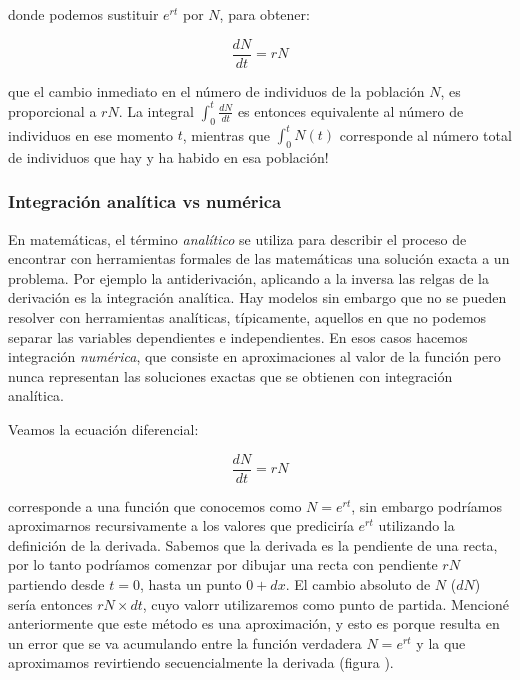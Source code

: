 \documentclass[
]{book}
\begin{document}
donde podemos sustituir \(e^{rt}\) por \(N\), para obtener:

\begin{equation}
\frac{dN}{dt} = r N
\end{equation}

que el cambio inmediato en el número de individuos de la población \(N\), es proporcional a \(rN\). La integral \(\int_{0}^{t} \frac{dN}{dt}\) es entonces equivalente al número de individuos en ese momento \(t\), mientras que \(\int_{0}^{t} N(t)\) corresponde al número total de individuos que hay y ha habido en esa población!

\hypertarget{integraciuxf3n-analuxedtica-vs-numuxe9rica}{%
\subsubsection{Integración analítica vs numérica}\label{integraciuxf3n-analuxedtica-vs-numuxe9rica}}

En matemáticas, el término \emph{analítico} se utiliza para describir el proceso de encontrar con herramientas formales de las matemáticas una solución exacta a un problema. Por ejemplo la antiderivación, aplicando a la inversa las relgas de la derivación es la integración analítica. Hay modelos sin embargo que no se pueden resolver con herramientas analíticas, típicamente, aquellos en que no podemos separar las variables dependientes e independientes. En esos casos hacemos integración \emph{numérica}, que consiste en aproximaciones al valor de la función pero nunca representan las soluciones exactas que se obtienen con integración analítica.

Veamos la ecuación diferencial:

\begin{equation}
\frac{dN}{dt} = rN \label{eq:dif-1}
\end{equation}

corresponde a una función que conocemos como \(N = e^{rt}\), sin embargo podríamos aproximarnos recursivamente a los valores que prediciría \(e^{rt}\) utilizando la definición de la derivada. Sabemos que la derivada es la pendiente de una recta, por lo tanto podríamos comenzar por dibujar una recta con pendiente \(rN\) partiendo desde \(t = 0\), hasta un punto \(0+dx\). El cambio absoluto de \(N\) (\(dN\)) sería entonces \(rN \times dt\), cuyo valorr utilizaremos como punto de partida. Mencioné anteriormente que este método es una aproximación, y esto es porque resulta en un error que se va acumulando entre la función verdadera \(N = e^{rt}\) y la que aproximamos revirtiendo secuencialmente la derivada (figura ).
\end{document}
